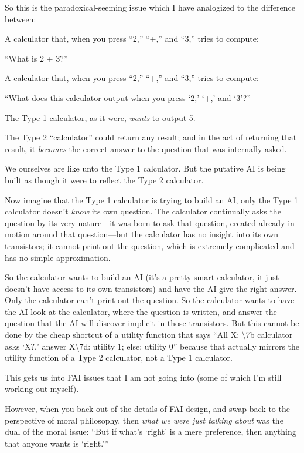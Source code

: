 {
 So this is the paradoxical-seeming issue which I have analogized
to the difference between:}

{
 A calculator that, when you press
``2,''
``+,'' and
``3,'' tries to compute:}

{
 ``What is 2 + 3?''}

{
 A calculator that, when you press
``2,''
``+,'' and
``3,'' tries to compute:}

{
 ``What does this calculator output when you press
`2,' `+,'
and `3'?''}

{
 The Type 1 calculator, as it were, \textit{wants} to output 5.}

{
 The Type 2 ``calculator'' could
return any result; and in the act of returning that result, it
\textit{becomes} the correct answer to the question that was internally
asked.}

{
 We ourselves are like unto the Type 1 calculator. But the putative
AI is being built as though it were to reflect the Type 2 calculator.}

{
 Now imagine that the Type 1 calculator is trying to build an AI,
only the Type 1 calculator doesn't \textit{know} its
own question. The calculator continually asks the question by its very
nature---it was born to ask that question, created already in motion
around that question---but the calculator has no insight into its own
transistors; it cannot print out the question, which is extremely
complicated and has no simple approximation.}

{
 So the calculator wants to build an AI (it's a
pretty smart calculator, it just doesn't have access to
its own transistors) and have the AI give the right answer. Only the
calculator can't print out the question. So the
calculator wants to have the AI look at the calculator, where the
question is written, and answer the question that the AI will discover
implicit in those transistors. But this cannot be done by the cheap
shortcut of a utility function that says ``All X:
{\textbackslash}{\textquotesingle}7b calculator asks
`X?,' answer
X{\textbackslash}{\textquotesingle}7d: utility 1; else: utility
0'' because that actually mirrors the utility
function of a Type 2 calculator, not a Type 1 calculator.}

{
 This gets us into FAI issues that I am not going into (some of
which I'm still working out myself).}

{
 However, when you back out of the details of FAI design, and swap
back to the perspective of moral philosophy, then \textit{what we were
just talking about} was the dual of the moral issue:
``But if what's
`right' is a mere preference, then
anything that anyone wants is
`right.'''}


